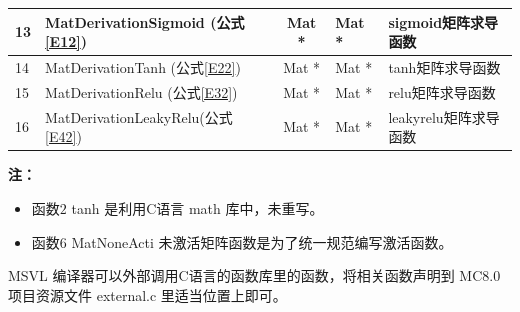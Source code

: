\documentclass[UTF-8]{progbookcn}
\begin{document}
\begin{table}[!h]
{\begin{tabular}{|l|l|c|l|l|l|l|}
13 & MatDerivationSigmoid (公式\ref{E12})  & \multicolumn{3}{c|}{Mat *}             & Mat * & sigmoid矩阵求导函数   \\ \hline
14 & MatDerivationTanh  (公式\ref{E22})    & \multicolumn{3}{c|}{Mat *}             & Mat * & tanh矩阵求导函数      \\ \hline
15 & MatDerivationRelu  (公式\ref{E32})    & \multicolumn{3}{c|}{Mat *}             & Mat * & relu矩阵求导函数      \\ \hline
16 & MatDerivationLeakyRelu(公式\ref{E42}) & \multicolumn{3}{c|}{Mat *}             & Mat * & leakyrelu矩阵求导函数 \\ \hline
\end{tabular}}
\end{table}

\noindent\textbf{注：}
\begin{itemize}
  \item 函数$2$ tanh 是利用C语言 math 库中，未重写。
  \item  函数$6$ MatNoneActi 未激活矩阵函数是为了统一规范编写激活函数。
\end{itemize}

\begin{information}
MSVL 编译器可以外部调用C语言的函数库里的函数，将相关函数声明到 MC8.0 项目资源文件 external.c 里适当位置上即可。
\end{information}
\end{document}

